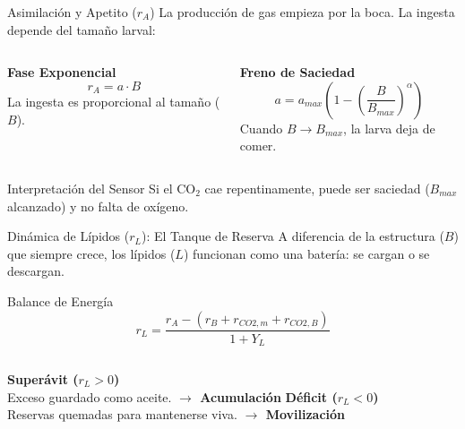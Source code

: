 \documentclass[aspectratio=169, 11pt]{beamer}
\begin{document}
\begin{frame}{Asimilación y Apetito ($r_A$)}
    La producción de gas empieza por la boca. La ingesta depende del tamaño larval:
    \vspace{0.3cm}
    \begin{columns}[T]
        \textbf{Fase Exponencial}
        $$ r_A = a \cdot B $$
        \small La ingesta es proporcional al tamaño ($B$).
        
        \textbf{Freno de Saciedad}
        $$ a = a_{max} \left( 1 - \left( \frac{B}{B_{max}} \right)^\alpha \right) $$
        \small Cuando $B \to B_{max}$, la larva deja de comer.
    \end{columns}
    \vspace{0.3cm}
    \begin{alertblock}{Interpretación del Sensor}
        Si el CO$_2$ cae repentinamente, puede ser saciedad ($B_{max}$ alcanzado) y no falta de oxígeno.
    \end{alertblock}
\end{frame}

\begin{frame}{Dinámica de Lípidos ($r_L$): El Tanque de Reserva}
    A diferencia de la estructura ($B$) que siempre crece, los lípidos ($L$) funcionan como una batería: se cargan o se descargan.
    \vspace{0.3cm}
    \begin{block}{Balance de Energía}
        $$ r_L = \frac{r_A - (r_B + r_{CO2,m} + r_{CO2,B})}{1 + Y_L} $$
    \end{block}
    \vspace{0.2cm}
    \begin{columns}[T]
        \textbf{Superávit ($r_L > 0$)}\\
        \small Exceso guardado como aceite. \textcolor{verdeOK}{\textbf{$\rightarrow$ Acumulación}}
        \textbf{Déficit ($r_L < 0$)}\\
        \small Reservas quemadas para mantenerse viva. \textcolor{rojoAlerta}{\textbf{$\rightarrow$ Movilización}}
    \end{columns}
\end{frame}
\end{document}
